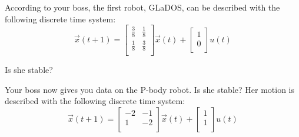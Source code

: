 \begin{enumerate}

\qitem According to your boss, the first robot, GLaDOS, can be described with the following discrete time system:
\begin{equation*}
    \vec{x}(t+1) =
    \begin{bmatrix}
    \frac{3}{8} & \frac{1}{8}\\
    \frac{1}{8} & \frac{3}{8}\\
    \end{bmatrix}
    \vec{x}(t) +
    \begin{bmatrix}
    1\\
    0\\
    \end{bmatrix}
    u(t)
\end{equation*}

Is she stable?


\qitem Your boss now gives you data on the P-body robot. Is she stable?
Her motion is described with the following discrete time system:
\begin{equation*}
    \vec{x}(t + 1) =
    \begin{bmatrix}
    -2 & -1\\
    1 & -2\\
    \end{bmatrix}
    \vec{x}(t) +
    \begin{bmatrix}
    1\\
    1\\
    \end{bmatrix}
    u(t)
\end{equation*}


\end{enumerate}
